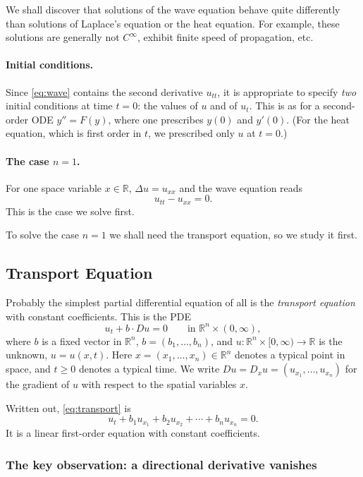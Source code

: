 \documentclass[11pt]{article}
\theoremstyle{plain}
\theoremstyle{definition}
\theoremstyle{remark}
\begin{document}
We shall discover that solutions of the wave equation behave quite differently than solutions of Laplace's equation or the heat equation. For example, these solutions are generally not $C^\infty$, exhibit finite speed of propagation, etc.

\paragraph{Initial conditions.} Since \eqref{eq:wave} contains the second derivative $u_{tt}$, it is appropriate to specify \emph{two} initial conditions at time $t = 0$: the values of $u$ and of $u_t$. This is as for a second-order ODE $y'' = F(y)$, where one prescribes $y(0)$ and $y'(0)$. (For the heat equation, which is first order in $t$, we prescribed only $u$ at $t = 0$.)

\paragraph{The case $n = 1$.} For one space variable $x \in \mathbb{R}$, $\Delta u = u_{xx}$ and the wave equation reads
$$ u_{tt} - u_{xx} = 0. $$
This is the case we solve first.

To solve the case $n = 1$ we shall need the transport equation, so we study it first.

\subsection{Transport Equation}\label{ssec:transport}

Probably the simplest partial differential equation of all is the \emph{transport equation} with constant coefficients. This is the PDE
\begin{equation}\label{eq:transport}
u_t + b\cdot Du = 0 \qquad \text{in } \mathbb{R}^n \times (0,\infty),
\end{equation}
where $b$ is a fixed vector in $\mathbb{R}^n$, $b = (b_1,\dots,b_n)$, and $u : \mathbb{R}^n \times [0,\infty) \to \mathbb{R}$ is the unknown, $u = u(x,t)$. Here $x = (x_1,\dots,x_n) \in \mathbb{R}^n$ denotes a typical point in space, and $t \geq 0$ denotes a typical time. We write $Du = D_xu = (u_{x_1},\dots,u_{x_n})$ for the gradient of $u$ with respect to the spatial variables $x$.

Written out, \eqref{eq:transport} is
$$ u_t + b_1u_{x_1} + b_2u_{x_2} + \cdots + b_nu_{x_n} = 0. $$
It is a linear first-order equation with constant coefficients.

\subsubsection{The key observation: a directional derivative vanishes}
\end{document}
